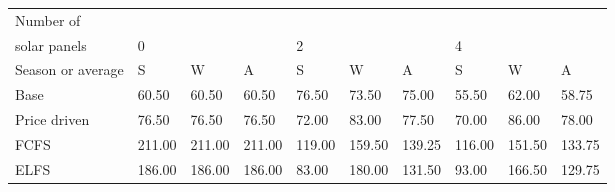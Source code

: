 \begin{table}[h] 
\centering 
\begin{tabular}{l|lll|lll|lll}Number of \\ solar panels&0& & &2& & &4& & \\ \hline 
Season or average & S & W & A & S & W & A & S & W & A \\ \hline 
Base&60.50&60.50&60.50&76.50&73.50&75.00&55.50&62.00&58.75 \\ 
Price driven&76.50&76.50&76.50&72.00&83.00&77.50&70.00&86.00&78.00 \\ 
FCFS&211.00&211.00&211.00&119.00&159.50&139.25&116.00&151.50&133.75 \\ 
ELFS&186.00&186.00&186.00&83.00&180.00&131.50&93.00&166.50&129.75 \\ 
\end{tabular} 
\end{table}